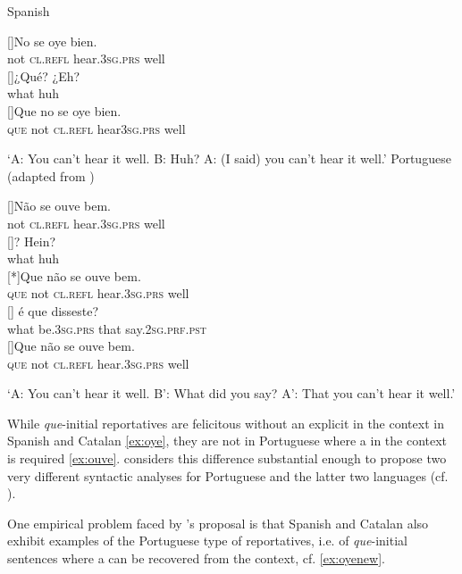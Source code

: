 \ea \label{ex:oyeouve}
\ea \label{ex:oye}
 Spanish
 \begin{xlist}
[]{\gll No se oye bien.\\
                not \textsc{cl.refl} hear.\textsc{3sg.prs} well\\}
[]{\gll  ¿Qué? ¿Eh? \\
				what huh\\}
[]{\gll  Que no se oye bien. \\
			    \textsc{que} not \textsc{cl.refl} hear\textsc{3sg.prs} well\\}
\end{xlist}
\glt `A: You can't hear it well. B: Huh? A: (I said) you can't hear it well.'
\ex \label{ex:ouve}
Portuguese (adapted from \citealt[148: ex 5]{Corr2016})
\begin{xlist}
[]{\gll Não se ouve bem.  \\
				not \textsc{cl.refl} hear.\textsc{3sg.prs} well\\}
[]{? Hein? \\
				what huh\\}
[*]{\gll Que não se ouve bem. \\
				 \textsc{que} not \textsc{cl.refl} hear.\textsc{3sg.prs} well\\}
[]{ é que disseste? \\
				 what be.\textsc{3sg.prs} that say.\textsc{2sg.prf.pst}\\}
[]{\gll Que não se ouve bem.\\
				 \textsc{que} not \textsc{cl.refl} hear.\textsc{3sg.prs} well\\}
\end{xlist}
\glt  `A: You can't hear it well. B': What did you say? A': That you can't hear it well.'
\z
\z




While  \emph{que}-initial reportatives are felicitous  without an explicit \emph{}  in the context  in Spanish and Catalan  \eqref{ex:oye}, they are not in Portuguese where a  \emph{} in the context is required \eqref{ex:ouve}.
 \citet{Corr2016} considers this difference substantial enough   to propose two very different syntactic analyses for Portuguese and the latter two languages (cf. ). 

One empirical problem faced by \citeauthor{Corr2016}'s proposal  is that    Spanish and Catalan also exhibit examples of the Portuguese type of reportatives, i.e. of \emph{que}-initial sentences where a \emph{} can be recovered from the context, cf. \eqref{ex:oyenew}.

